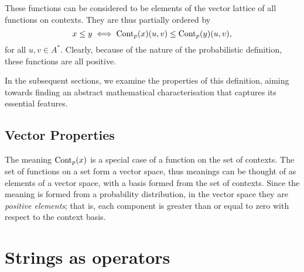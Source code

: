 These functions can be considered to be elements of the vector lattice of all functions on contexts. They are thus partially ordered by
$$x \le y \iff \mathrm{Cont}_p(x)(u,v) \le \mathrm{Cont}_p(y)(u,v),$$
for all $u,v \in A^*$. Clearly, because of the nature of the probabilistic definition, these functions are all positive.

In the subsequent sections, we examine the properties of this definition, aiming towards finding an abstract mathematical characterisation that captures its essential features.

\subsection{Vector Properties}

The meaning $\mathrm{Cont}_p(x)$ is a special case of a function on the set of contexts. The set of functions on a set form a vector space, thus meanings can be thought of as elements of a vector space, with a basis formed from the set of contexts. Since the meaning is formed from a probability distribution, in the vector space they are \emph{positive elements}; that is, each component is greater than or equal to zero with respect to the context basis.



\section{Strings as operators}


